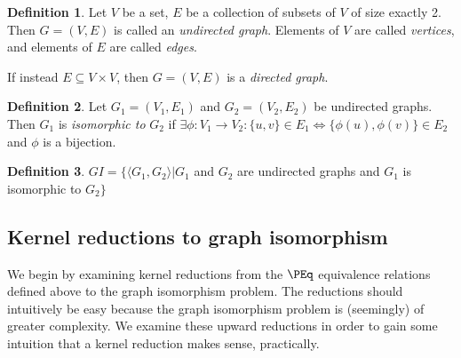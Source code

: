 \documentclass{article}
\theoremstyle{definition} \newtheorem{definition}[definition]{Definition}
\newcommand{\defn}[1]{\emph{#1}} %
\newcommand{\pair}[2]{\langle#1,#2\rangle} %
\begin{document}
\begin{definition}
  Let $V$ be a set, $E$ be a collection of subsets of $V$ of size exactly
  2. Then $G=(V, E)$ is called an \defn{undirected graph}. Elements of $V$ are
  called \defn{vertices}, and elements of $E$ are called \defn{edges}.

  If instead $E\subseteq V\times V$, then $G=(V, E)$ is a \defn{directed
    graph}.
\end{definition}
\begin{definition}
  Let $G_1=(V_1,E_1)$ and $G_2=(V_2, E_2)$ be undirected graphs. Then $G_1$ is
  \defn{isomorphic to} $G_2$ if $\exists \phi\colon V_1\to V_2:\{u,v\}\in
  E_1\iff \{\phi(u), \phi(v)\}\in E_2$ and $\phi$ is a bijection.
\end{definition}
\begin{definition}
  $GI=\{\pair{G_1}{G_2}|G_1$ and $G_2$ are undirected graphs and $G_1$ is
  isomorphic to $G_2\}$
\end{definition}

\subsection{Kernel reductions to graph isomorphism}
We begin by examining kernel reductions from the $\PEq$ equivalence relations
defined above to the graph isomorphism problem. The reductions should
intuitively be easy because the graph isomorphism problem is (seemingly) of
greater complexity. We examine these upward reductions in order to gain some
intuition that a kernel reduction makes sense, practically.
\end{document}
